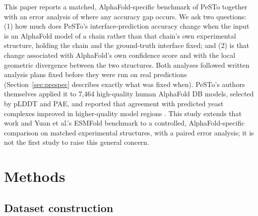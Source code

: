 \documentclass[10pt]{article}
\begin{document}
This paper reports a matched, AlphaFold-specific benchmark of PeSTo together
with an error analysis of where any accuracy gap occurs. We ask two
questions: (1) how much does PeSTo's interface-prediction accuracy change when
the input is an AlphaFold model of a chain rather than that chain's own
experimental structure, holding the chain and the ground-truth interface
fixed; and (2) is that change associated with AlphaFold's own confidence score
and with the local geometric divergence between the two structures. Both
analyses followed written analysis plans fixed before they were run on real
predictions (Section~\ref{sec:prespec} describes exactly what was fixed when).
PeSTo's authors themselves applied it to 7,464 high-quality human AlphaFold
DB models, selected by pLDDT and PAE, and reported that agreement with
predicted yeast complexes improved in higher-quality model regions
\cite{krapp2023}. This study extends that work and Yuan et al.'s ESMFold
benchmark to a controlled, AlphaFold-specific comparison on matched
experimental structures, with a paired error analysis; it is not the first
study to raise this general concern.

\section{Methods}

\subsection{Dataset construction}
\end{document}
